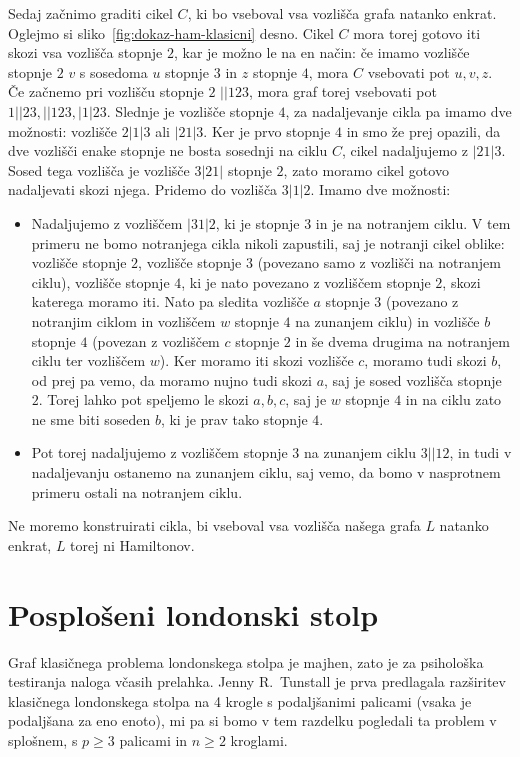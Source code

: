 \documentclass[twoside,11pt]{article}
\begin{document}
\begin{dokaz}
Sedaj začnimo graditi cikel $C$, ki bo vseboval vsa vozlišča grafa natanko enkrat. Oglejmo si sliko~\ref{fig:dokaz-ham-klasicni} desno.
Cikel $C$ mora torej gotovo iti skozi vsa vozlišča stopnje $2$, kar je možno le na en način: če imamo vozlišče stopnje $2$ $v$ s sosedoma $u$ stopnje $3$ in $z$ stopnje $4$, mora $C$ vsebovati pot $u,v,z$.
Če začnemo pri vozlišču stopnje $2$ $||123$, mora graf torej vsebovati pot $1||23, ||123, |1|23$. Slednje je vozlišče stopnje $4$, za nadaljevanje cikla pa imamo dve možnosti: vozlišče $2|1|3$ ali $|21|3$. Ker je prvo stopnje $4$ in smo že prej opazili, da dve vozlišči enake stopnje ne bosta sosednji na ciklu $C$, cikel nadaljujemo z $|21|3$. Sosed tega vozlišča je vozlišče $3|21|$ stopnje $2$, zato moramo cikel gotovo nadaljevati skozi njega. Pridemo do vozlišča $3|1|2$. Imamo dve možnosti: 
\begin{itemize}[label={--}]
    \item Nadaljujemo z vozliščem $|31|2$, ki je stopnje $3$ in je na notranjem ciklu. V tem primeru ne bomo notranjega cikla nikoli zapustili, saj je notranji cikel oblike: vozlišče stopnje $2$, vozlišče stopnje $3$ (povezano samo z vozlišči na notranjem ciklu), vozlišče stopnje $4$, ki je nato povezano z vozliščem stopnje $2$, skozi katerega moramo iti. Nato pa sledita vozlišče $a$ stopnje $3$ (povezano z notranjim ciklom in vozliščem $w$ stopnje $4$ na zunanjem ciklu) in vozlišče $b$ stopnje $4$ (povezan z vozliščem $c$ stopnje $2$ in še dvema drugima na notranjem ciklu ter vozliščem $w$). Ker moramo iti skozi vozlišče $c$, moramo tudi skozi $b$, od prej pa vemo, da moramo nujno tudi skozi $a$, saj je sosed vozlišča stopnje $2$. Torej lahko pot speljemo le skozi $a,b,c$, saj je $w$ stopnje $4$ in na ciklu zato ne sme biti soseden $b$, ki je prav tako stopnje $4$.
    \item Pot torej nadaljujemo z vozliščem stopnje $3$ na zunanjem ciklu $3||12$, in tudi v nadaljevanju ostanemo na zunanjem ciklu, saj vemo, da bomo v nasprotnem primeru ostali na notranjem ciklu.
\end{itemize}
Ne moremo konstruirati cikla, bi vseboval vsa vozlišča našega grafa $L$ natanko enkrat, $L$ torej ni Hamiltonov.
\QED
\end{dokaz}

\section{Posplošeni londonski stolp}
Graf klasičnega problema londonskega stolpa je majhen, zato je za psihološka testiranja naloga včasih prelahka. 
Jenny R.\ Tunstall je prva predlagala razširitev klasičnega londonskega stolpa na 4 krogle s podaljšanimi palicami (vsaka je podaljšana za eno enoto), mi pa si bomo v tem razdelku pogledali ta problem v splošnem, s $p \geq 3$ palicami in $n \geq 2$ kroglami.
\end{document}
